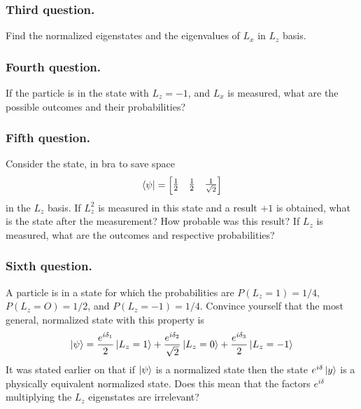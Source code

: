 \documentclass[../../../main.tex]{subfiles}
\begin{document}
\subsubsection{Third question.}
Find the normalized eigenstates and the eigenvalues of $L_x$ in $L_z$ basis.

\subsubsection{Fourth question.}
If the particle is in the state with $L_z = -1$, and $L_x$ is measured, what are the possible outcomes and their probabilities?

\subsubsection{Fifth question.}
Consider the state, in bra to save space 
\begin{equation*}
    \bra{\psi}=\begin{bmatrix}
        \frac{1 }{2}&\frac{1 }{2}&\frac{1 }{\sqrt{2}}
    \end{bmatrix}
\end{equation*}
in the $L_z$ basis.
If $L_z^2$ is measured in this state and a result $+1$ is obtained, what is the state after the measurement? 
How probable was this result? 
If $L_z$ is measured, what are the outcomes and respective probabilities?

\subsubsection{Sixth question.}
A particle is in a state for which the probabilities are $P(L_z=1)=1/4$, $P(L_z=O)=1/2$, and $P(L_z =-1)= 1 /4$. 
Convince yourself that the most general, normalized state with this property is
\begin{equation*}
    \ket{\psi}=\frac{e^{i\delta_1 }}{2 }\ket{L_z=1}+\frac{e^{i \delta_2 }}{\sqrt{2 }}\ket{L_z=0}+\frac{e^{i \delta_3 }}{2}\ket{L_z=-1}
\end{equation*}
It was stated earlier on that if $\ket{\psi}$ is a normalized state then the state $e^{i\delta}\ket{y}$ is a physically equivalent normalized state. 
Does this mean that the factors $e^{i\delta}$ multiplying the $L_z$ eigenstates are irrelevant?
\end{document}
